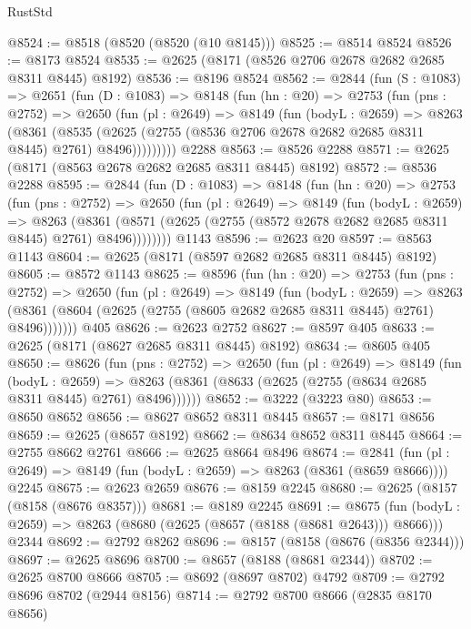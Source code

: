 \begin{lexlean}{RustStd}
\begin{coremodule}
@8524 := @8518 (@8520 (@8520 (@10 @8145)))
@8525 := @8514 @8524
@8526 := @8173 @8524
@8535 := @2625 (@8171 (@8526 @2706 @2678 @2682 @2685 @8311 @8445) @8192)
@8536 := @8196 @8524
@8562 := @2844
    (fun (S : @1083) =>
    @2651
      (fun (D : @1083) =>
      @8148
        (fun (hn : @20) =>
        @2753
          (fun (pns : @2752) =>
          @2650
            (fun (pl : @2649) =>
            @8149
              (fun (bodyL : @2659) =>
              @8263
                (@8361
                  (@8535
                    (@2625 (@2755 (@8536 @2706 @2678 @2682 @2685 @8311 @8445) @2761) @8496)))))))))
    @2288
@8563 := @8526 @2288
@8571 := @2625 (@8171 (@8563 @2678 @2682 @2685 @8311 @8445) @8192)
@8572 := @8536 @2288
@8595 := @2844
    (fun (D : @1083) =>
    @8148
      (fun (hn : @20) =>
      @2753
        (fun (pns : @2752) =>
        @2650
          (fun (pl : @2649) =>
          @8149
            (fun (bodyL : @2659) =>
            @8263
              (@8361 (@8571 (@2625 (@2755 (@8572 @2678 @2682 @2685 @8311 @8445) @2761) @8496))))))))
    @1143
@8596 := @2623 @20
@8597 := @8563 @1143
@8604 := @2625 (@8171 (@8597 @2682 @2685 @8311 @8445) @8192)
@8605 := @8572 @1143
@8625 := @8596
    (fun (hn : @20) =>
    @2753
      (fun (pns : @2752) =>
      @2650
        (fun (pl : @2649) =>
        @8149
          (fun (bodyL : @2659) =>
          @8263 (@8361 (@8604 (@2625 (@2755 (@8605 @2682 @2685 @8311 @8445) @2761) @8496)))))))
    @405
@8626 := @2623 @2752
@8627 := @8597 @405
@8633 := @2625 (@8171 (@8627 @2685 @8311 @8445) @8192)
@8634 := @8605 @405
@8650 := @8626
    (fun (pns : @2752) =>
    @2650
      (fun (pl : @2649) =>
      @8149
        (fun (bodyL : @2659) =>
        @8263 (@8361 (@8633 (@2625 (@2755 (@8634 @2685 @8311 @8445) @2761) @8496))))))
@8652 := @3222 (@3223 @80)
@8653 := @8650 @8652
@8656 := @8627 @8652 @8311 @8445
@8657 := @8171 @8656
@8659 := @2625 (@8657 @8192)
@8662 := @8634 @8652 @8311 @8445
@8664 := @2755 @8662 @2761
@8666 := @2625 @8664 @8496
@8674 := @2841
    (fun (pl : @2649) => @8149 (fun (bodyL : @2659) => @8263 (@8361 (@8659 @8666))))
    @2245
@8675 := @2623 @2659
@8676 := @8159 @2245
@8680 := @2625 (@8157 (@8158 (@8676 @8357)))
@8681 := @8189 @2245
@8691 := @8675
    (fun (bodyL : @2659) => @8263 (@8680 (@2625 (@8657 (@8188 (@8681 @2643))) @8666)))
    @2344
@8692 := @2792 @8262
@8696 := @8157 (@8158 (@8676 (@8356 @2344)))
@8697 := @2625 @8696
@8700 := @8657 (@8188 (@8681 @2344))
@8702 := @2625 @8700 @8666
@8705 := @8692 (@8697 @8702) @4792
@8709 := @2792 @8696 @8702 (@2944 @8156)
@8714 := @2792 @8700 @8666 (@2835 @8170 @8656)

\end{coremodule}
\end{lexlean}
